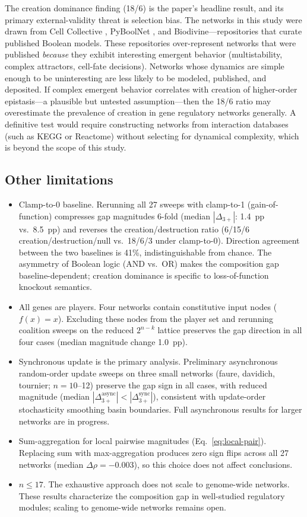 \documentclass[10pt]{article}
\begin{document}
The creation dominance finding (18/6) is the paper's headline result,
and its primary external-validity threat is selection bias.
The networks in this study were drawn from Cell Collective
\citep{helikar2012cell}, PyBoolNet \citep{klarner2017pyboolnet}, and
Biodivine---repositories that curate published Boolean models. These
repositories over-represent networks that were published \emph{because}
they exhibit interesting emergent behavior (multistability, complex
attractors, cell-fate decisions). Networks whose dynamics are simple
enough to be uninteresting are less likely to be modeled, published,
and deposited. If complex emergent behavior correlates with creation
of higher-order epistasis---a plausible but untested assumption---then
the 18/6 ratio may overestimate the prevalence of creation in gene
regulatory networks generally. A definitive test would require
constructing networks from interaction databases (such as KEGG or
Reactome) without selecting for dynamical complexity, which is beyond
the scope of this study.

\subsection{Other limitations}

\begin{itemize}
\item Clamp-to-0 baseline. Rerunning all 27 sweeps with
  clamp-to-1 (gain-of-function) compresses gap magnitudes 6-fold
  (median $|\Delta_{3+}|$: 1.4~pp vs.\ 8.5~pp) and reverses the
  creation/destruction ratio (6/15/6 creation/destruction/null vs.\
  18/6/3 under clamp-to-0). Direction agreement between the two
  baselines is 41\%, indistinguishable from chance. The asymmetry of
  Boolean logic (AND vs.\ OR) makes the composition gap
  baseline-dependent; creation dominance is specific to
  loss-of-function knockout semantics.
\item All genes are players. Four networks contain constitutive
  input nodes ($f(x) = x$). Excluding these nodes from the player set
  and rerunning coalition sweeps on the reduced $2^{n-k}$ lattice
  preserves the gap direction in all four cases (median magnitude
  change 1.0~pp).
\item Synchronous update is the primary analysis. Preliminary
  asynchronous random-order update sweeps on three small networks
  (faure, davidich, tournier; $n = 10$--12) preserve the gap sign
  in all cases, with reduced magnitude (median
  $|\Delta_{3+}^{\mathrm{async}}| < |\Delta_{3+}^{\mathrm{sync}}|$),
  consistent with update-order stochasticity smoothing basin
  boundaries. Full asynchronous results for larger networks are
  in progress.
\item Sum-aggregation for local pairwise magnitudes
  (Eq.~\ref{eq:local-pair}). Replacing sum with max-aggregation
  produces zero sign flips across all 27 networks (median $\Delta\rho
  = -0.003$), so this choice does not affect conclusions.
\item $n \leq 17$. The exhaustive approach does not scale to
  genome-wide networks. These results characterize the composition
  gap in well-studied regulatory modules; scaling to genome-wide
  networks remains open.
\end{itemize}
\end{document}
